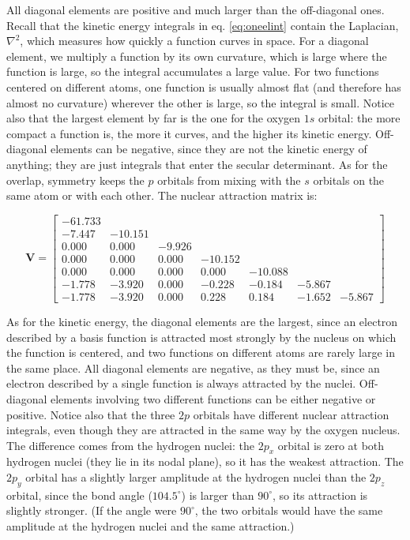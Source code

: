 \documentclass[
  english,
  9pt,
]{extbook}
\theoremstyle{definition}
\theoremstyle{definition}
\theoremstyle{definition}
\theoremstyle{definition}
\theoremstyle{remark}
\begin{document}
All diagonal elements are positive and much larger than the off-diagonal ones. Recall that the kinetic energy integrals in eq. \eqref{eq:oneelint} contain the Laplacian, \(\nabla^2\), which measures how quickly a function curves in space. For a diagonal element, we multiply a function by its own curvature, which is large where the function is large, so the integral accumulates a large value. For two functions centered on different atoms, one function is usually almost flat (and therefore has almost no curvature) wherever the other is large, so the integral is small. Notice also that the largest element by far is the one for the oxygen \(1s\) orbital: the more compact a function is, the more it curves, and the higher its kinetic energy. Off-diagonal elements can be negative, since they are not the kinetic energy of anything; they are just integrals that enter the secular determinant. As for the overlap, symmetry keeps the \(p\) orbitals from mixing with the \(s\) orbitals on the same atom or with each other. The nuclear attraction matrix is:

\begin{equation}
\mathbf{V}=
\begin{bmatrix}
-61.733 & & & & & & \\
-7.447 & -10.151 & & & & &  \\
0.000 & 0.000 & -9.926 & & & & \\
0.000 & 0.000 & 0.000 & -10.152 & & & \\
0.000 & 0.000 & 0.000 & 0.000 & -10.088 & & \\
-1.778 & -3.920 & 0.000 & -0.228 & -0.184 & -5.867 & \\
-1.778 & -3.920 & 0.000 & 0.228 & 0.184 & -1.652 & -5.867
\end{bmatrix}
\label{eq:vmatrix}
\end{equation}

As for the kinetic energy, the diagonal elements are the largest, since an electron described by a basis function is attracted most strongly by the nucleus on which the function is centered, and two functions on different atoms are rarely large in the same place. All diagonal elements are negative, as they must be, since an electron described by a single function is always attracted by the nuclei. Off-diagonal elements involving two different functions can be either negative or positive. Notice also that the three \(2p\) orbitals have different nuclear attraction integrals, even though they are attracted in the same way by the oxygen nucleus. The difference comes from the hydrogen nuclei: the \(2p_x\) orbital is zero at both hydrogen nuclei (they lie in its nodal plane), so it has the weakest attraction. The \(2p_y\) orbital has a slightly larger amplitude at the hydrogen nuclei than the \(2p_z\) orbital, since the bond angle (\(104.5^\circ\)) is larger than \(90^\circ\), so its attraction is slightly stronger. (If the angle were \(90^\circ\), the two orbitals would have the same amplitude at the hydrogen nuclei and the same attraction.)
\end{document}
